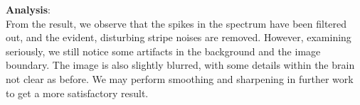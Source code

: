 \documentclass[UTF8]{ctexart}
\begin{document}
\textbf{Analysis}:\\
From the result, we observe that the spikes in the spectrum have been filtered out, and the
evident, disturbing stripe noises are removed. However, examining seriously, we still notice 
some artifacts in the background and the image boundary. The image is also slightly blurred, with some details within
the brain not clear as before.
We may perform smoothing and sharpening in further work to get a more satisfactory result.
\end{document}

